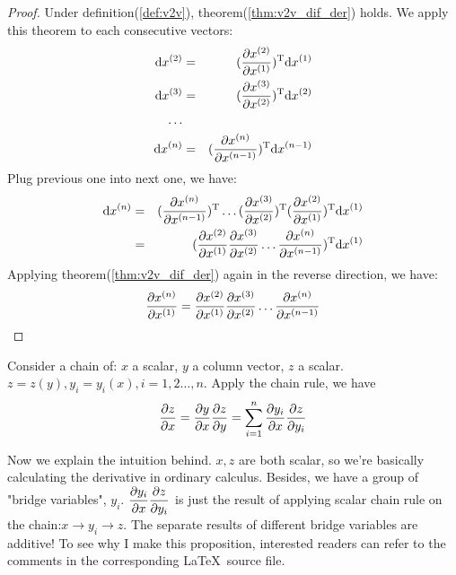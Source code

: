 \begin{proof}
Under definition(\ref{def:v2v}), theorem(\ref{thm:v2v_dif_der}) holds. 
We apply this theorem to each consecutive vectors:
\begin{eqnarray}
	\mathrm{d}x^{(2)} &=& (\dfrac{\partial x^{(2)}}{\partial x^{(1)}})^\mathrm{T} \mathrm{d}x^{(1)} \\
	\mathrm{d}x^{(3)} &=& (\dfrac{\partial x^{(3)}}{\partial x^{(2)}})^\mathrm{T} \mathrm{d}x^{(2)} \\
	\ldots \\
	\mathrm{d}x^{(n)} &=& (\dfrac{\partial x^{(n)}}{\partial x^{(n-1)}})^\mathrm{T} \mathrm{d}x^{(n-1)}
\end{eqnarray} 
Plug previous one into next one, we have:
\begin{eqnarray}
	\mathrm{d}x^{(n)} &=& (\dfrac{\partial x^{(n)}}{\partial x^{(n-1)}})^\mathrm{T} 
	\ldots
	(\dfrac{\partial x^{(3)}}{\partial x^{(2)}})^\mathrm{T} 
	(\dfrac{\partial x^{(2)}}{\partial x^{(1)}})^\mathrm{T} 
	\mathrm{d}x^{(1)} \\
	&=& (\dfrac{\partial x^{(2)}}{\partial x^{(1)}} \dfrac{\partial x^{(3)}}{\partial x^{(2)}}
	\ldots \dfrac{\partial x^{(n)}}{\partial x^{(n-1)}} )^\mathrm{T} \mathrm{d}x^{(1)}
\end{eqnarray}
Applying theorem(\ref{thm:v2v_dif_der}) again in the reverse direction, 
we have:
\begin{equation}
	\dfrac{\partial x^{(n)}}{\partial x^{(1)}} = \dfrac{\partial x^{(2)}}{\partial x^{(1)}}
	\dfrac{\partial x^{(3)}}{\partial x^{(2)}} \ldots \dfrac{\partial x^{(n)}}{\partial x^{(n-1)}}
\end{equation}
\end{proof}

\begin{myprop}
Consider a chain of: $x$ a scalar, $y$ a column vector, $z$ a scalar. 
$z = z(y), y_i = y_i(x), i=1,2\ldots, n$. Apply the chain rule, we have
	\begin{equation}
		\dfrac{\partial z}{\partial x} = \dfrac{\partial y}{\partial x} \dfrac{\partial z}{\partial y} = 
		\sum_{i=1}^{n}{ \dfrac{\partial y_i}{\partial x} \dfrac{\partial z}{\partial y_i} }
	\end{equation}
\end{myprop}
Now we explain the intuition behind. $x,z$ are both scalar, so 
we're basically calculating the derivative in ordinary calculus. 
Besides, we have a group of "bridge variables", $y_i$. 
$\dfrac{\partial y_i}{\partial x} \dfrac{\partial z}{\partial y_i}$ is just the result of applying 
scalar chain rule on the chain:$x \rightarrow y_i \rightarrow z$. 
The separate results of different bridge variables are additive!
To see why I make this proposition, interested readers can refer 
to the comments in the corresponding \LaTeX ~source file. 

